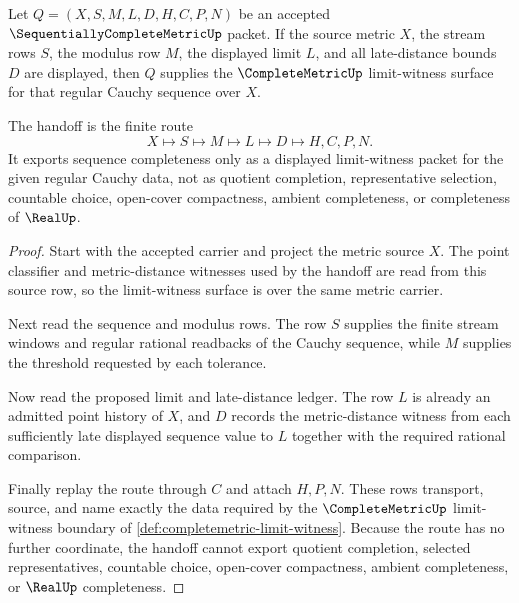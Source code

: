\begin{theorem}
\label{thm:sequentially-complete-metric-complete-metric-handoff}
Let $Q=(X,S,M,L,D,H,C,P,N)$ be an accepted $\SequentiallyCompleteMetricUp$ packet. If the source metric $X$, the stream rows $S$, the modulus row $M$, the displayed limit $L$, and all late-distance bounds $D$ are displayed, then $Q$ supplies the $\CompleteMetricUp$ limit-witness surface for that regular Cauchy sequence over $X$.

The handoff is the finite route
$$
X\longmapsto S\longmapsto M\longmapsto L\longmapsto D\longmapsto H,C,P,N .
$$
It exports sequence completeness only as a displayed limit-witness packet for the given regular Cauchy data, not as quotient completion, representative selection, countable choice, open-cover compactness, ambient completeness, or completeness of $\RealUp$.
\end{theorem}
\begin{proof}
Start with the accepted carrier and project the metric source $X$. The point classifier and metric-distance witnesses used by the handoff are read from this source row, so the limit-witness surface is over the same metric carrier.

Next read the sequence and modulus rows. The row $S$ supplies the finite stream windows and regular rational readbacks of the Cauchy sequence, while $M$ supplies the threshold requested by each tolerance.

Now read the proposed limit and late-distance ledger. The row $L$ is already an admitted point history of $X$, and $D$ records the metric-distance witness from each sufficiently late displayed sequence value to $L$ together with the required rational comparison.

Finally replay the route through $C$ and attach $H,P,N$. These rows transport, source, and name exactly the data required by the $\CompleteMetricUp$ limit-witness boundary of \autoref{def:completemetric-limit-witness}. Because the route has no further coordinate, the handoff cannot export quotient completion, selected representatives, countable choice, open-cover compactness, ambient completeness, or $\RealUp$ completeness.
\end{proof}

